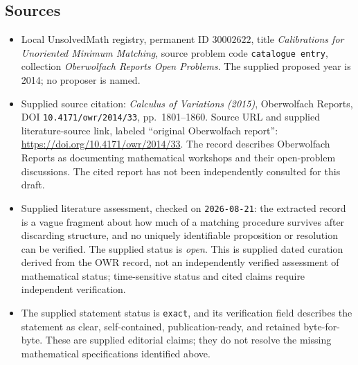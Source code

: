 \documentclass[11pt]{article}
\begin{document}
\subsection{Sources}
\begin{itemize}
\item Local UnsolvedMath registry, permanent ID \(30002622\), title \emph{Calibrations for Unoriented Minimum Matching}, source problem code \texttt{catalogue entry}, collection \emph{Oberwolfach Reports Open Problems}. The supplied proposed year is 2014; no proposer is named.
\item Supplied source citation: \emph{Calculus of Variations (2015)}, Oberwolfach Reports, DOI \texttt{10.4171/owr/2014/33}, pp.\ 1801--1860. Source URL and supplied literature-source link, labeled ``original Oberwolfach report'': \url{https://doi.org/10.4171/owr/2014/33}. The record describes Oberwolfach Reports as documenting mathematical workshops and their open-problem discussions. The cited report has not been independently consulted for this draft.
\item Supplied literature assessment, checked on \texttt{2026-08-21}: the extracted record is a vague fragment about how much of a matching procedure survives after discarding structure, and no uniquely identifiable proposition or resolution can be verified. The supplied status is \emph{open}. This is supplied dated curation derived from the OWR record, not an independently verified assessment of mathematical status; time-sensitive status and cited claims require independent verification.
\item The supplied statement status is \texttt{exact}, and its verification field describes the statement as clear, self-contained, publication-ready, and retained byte-for-byte. These are supplied editorial claims; they do not resolve the missing mathematical specifications identified above.
\end{itemize}
\end{document}
